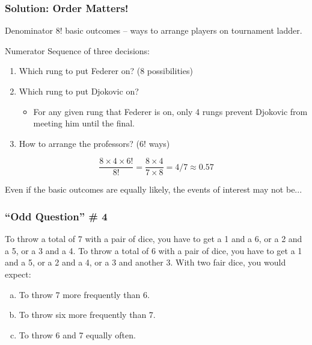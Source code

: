 \documentclass{beamer}
\begin{document}
\begin{frame}
  \frametitle{Solution: Order Matters!}
  \begin{block}{Denominator}
	$8!$ basic outcomes -- ways to arrange players on tournament ladder.
  \end{block}
  \begin{block}{Numerator}
   Sequence of three decisions:
   \begin{enumerate}
    \item Which rung to put Federer on? (8 possibilities)
    \item Which rung to put Djokovic on? 
      \begin{itemize}
        \item For any given rung that Federer is on, only 4 rungs prevent Djokovic from meeting him until the final.
      \end{itemize}
    \item How to arrange the professors? ($6!$ ways)
   \end{enumerate}
  \end{block}
\alert{$$\frac{8 \times 4 \times 6!}{8!} = \frac{8\times 4}{7\times 8} = 4/7 \approx 0.57$$}

\end{frame}
\begin{frame}

\centering \Huge Even if the basic outcomes are equally likely, the events of interest may not be...


\end{frame}
\begin{frame}
\frametitle{``Odd Question'' \# 4}
To throw a total of 7 with a pair of dice, you have to get a 1 and a 6, or a 2 and a 5, or a 3 and a 4.
To throw a total of 6 with a pair of dice, you have to get a 1 and a 5, or a 2 and a 4, or a 3 and another 3.
	\vspace{1em}
	With two fair dice, you would expect:
		\begin{enumerate}[(a)]
			\item To throw 7 more frequently than 6.
			\item To throw six more frequently than 7.
			\item To throw 6 and 7 equally often.
		\end{enumerate}
\end{frame}
\end{document}
